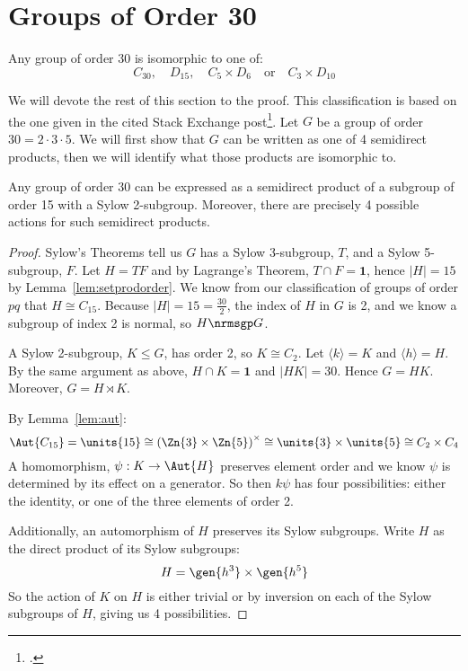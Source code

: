 \section{Groups of Order 30}
\begin{theorem}\label{thm:30}
    Any group of order 30 is isomorphic to one of:
    \[
        C_{30}, \quad%
        D_{15}, \quad%
        C_5 \times D_6 \quad \text{or} \quad%
        C_3 \times D_{10}
    \]
\end{theorem}

We will devote the rest of this section to the proof.
This classification is based on the one given in the cited Stack Exchange post\footcite{order30}.
Let \(G\) be a group of order \(30 = 2 \cdot 3 \cdot 5\).
We will first show that \(G\) can be written as one of 4 semidirect products, then we will identify what those products
are isomorphic to.

\begin{lemma}\label{lem:order_30_actions}
    Any group of order 30 can be expressed as a semidirect product of a subgroup of order 15 with a Sylow 2-subgroup.
    Moreover, there are precisely 4 possible actions for such semidirect products.
\end{lemma}

\begin{proof}
    Sylow's Theorems tell us \(G\) has a Sylow 3-subgroup, \(T\), and a Sylow 5-subgroup, \(F\).
    Let \(H = TF\) and by Lagrange's Theorem, \(T \cap F = \bm{1}\), hence \(|H| = 15\) by Lemma~\ref{lem:setprodorder}.
    We know from our classification of groups of order \(pq\) that \(H \cong C_{15}\).
    Because \(|H| = 15 = \frac{30}{2}\), the index of \(H\) in \(G\) is 2, and we know a subgroup of index 2 is normal,
    so \(H \nrmsgp G\).

    A Sylow 2-subgroup, \(K \leqslant G\), has order 2, so \(K \cong C_2\).
    Let \(\langle k \rangle = K\) and \(\langle h \rangle = H\).
    By the same argument as above, \(H \cap K = \bm{1}\) and \(|HK| = 30\).
    Hence \(G = HK\).
    Moreover, \(G = H \rtimes K\).

    By Lemma~\ref{lem:aut}:
    \[\Aut{C_{15}} = \units{15} \cong {(\Zn{3} \times \Zn{5})}^\times \cong \units{3} \times \units{5} \cong C_2 \times C_4\]
    A homomorphism, \(\psi:K \to \Aut{H}\) preserves element order and we know \(\psi\) is determined by its
    effect on a generator.
    So then \(k\psi\) has four possibilities: either the identity, or one of the three elements
    of order 2.

    Additionally, an automorphism of \(H\) preserves its Sylow subgroups.
    Write \(H\) as the direct product of its Sylow subgroups:
    \[H = \gen{h^3} \times \gen{h^5}\]
    So the action of \(K\) on \(H\) is either trivial or by inversion on each of the Sylow subgroups of \(H\), giving us 4
    possibilities.
\end{proof}


